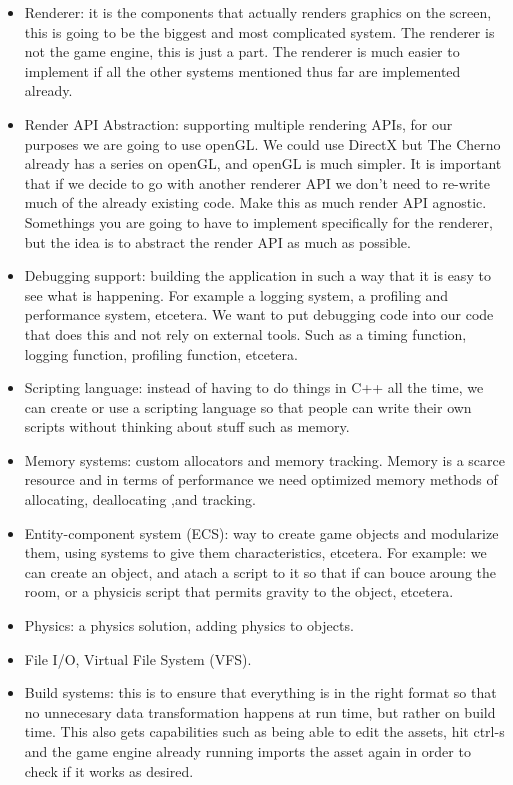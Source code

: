 \begin{itemize}
    \item Renderer: it is the components that actually renders graphics on the screen, this is going to be the biggest and most complicated system. The renderer is not the game engine, this is just a part. The renderer is much easier to implement if all the other systems mentioned thus far are implemented already.
    \item Render API Abstraction: supporting multiple rendering APIs, for our purposes we are going to use openGL. We could use DirectX but The Cherno already has a series on openGL, and openGL is much simpler. It is important that if we decide to go with another renderer API we don't need to re-write much of the already existing code. Make this as much render API agnostic. Somethings you are going to have to implement specifically for the renderer, but the idea is to abstract the render API as much as possible.
    \item Debugging support: building the application in such a way that it is easy to see what is happening. For example a logging system, a profiling and performance system, etcetera. We want to put debugging code into our code that does this and not rely on external tools. Such as a timing function, logging function, profiling function, etcetera.
    \item Scripting language: instead of having to do things in C++ all the time, we can create or use a scripting language so that people can write their own scripts without thinking about stuff such as memory.
    \item Memory systems: custom allocators and memory tracking. Memory is a scarce resource and in terms of performance we need optimized memory methods of allocating, deallocating ,and tracking.
    \item Entity-component system (ECS): way to create game objects and modularize them, using systems to give them characteristics, etcetera. For example: we can create an object, and atach a script to it so that if can bouce aroung the room, or a physicis script that permits gravity to the object, etcetera.
    \item Physics: a physics solution, adding physics to objects.
    \item File I/O, Virtual File System (VFS).
    \item Build systems: this is to ensure that everything is in the right format so that no unnecesary data transformation happens at run time, but rather on build time. This also gets capabilities such as being able to edit the assets, hit ctrl-s and the game engine already running imports the asset again in order to check if it works as desired.
\end{itemize}

